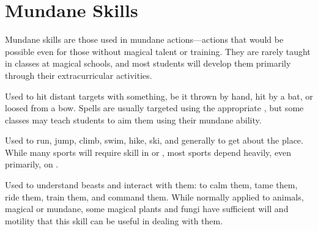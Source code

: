
\section{Mundane Skills}

Mundane skills are those used in mundane actions---actions that would be possible even for those without magical talent or training.
They are rarely taught in classes at magical schools, and most students will develop them primarily through their extracurricular activities.


Used to hit distant targets with something, be it thrown by hand, hit by a bat, or loosed from a bow.
Spells are usually targeted using the appropriate {\magicskill}, but some classes may teach students to aim them using their mundane ability. %


Used to run, jump, climb, swim, hike, ski, and generally to get about the place.
While many sports will require skill in  or , most sports depend heavily, even primarily, on .


Used to understand beasts and interact with them: to calm them, tame them, ride them, train them, and command them.
While normally applied to animals, magical or mundane, some magical plants and fungi have sufficient will and motility that this skill can be useful in dealing with them.


